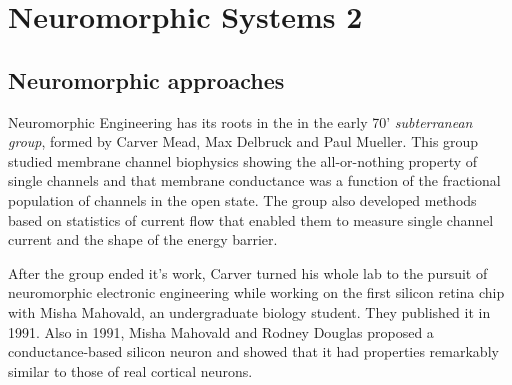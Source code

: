 \documentclass[main]{subfiles}
\begin{document}
\newpage
\section{Neuromorphic Systems 2} \label{l12}

\subsection{Neuromorphic approaches}
Neuromorphic Engineering has its roots in the in the early 70' \textit{subterranean group}, formed by Carver Mead, Max Delbruck and Paul Mueller. This group studied membrane channel biophysics showing the all-or-nothing property of single channels and that membrane conductance was a function of the fractional population of channels in the open state. The group also developed methods based on statistics of current flow that enabled them to measure single channel current and the shape of the energy barrier.

After the group ended it's work, Carver turned his whole lab to the pursuit of neuromorphic electronic engineering while working on the first silicon retina chip with Misha Mahovald, an undergraduate biology student. They published it in 1991.
Also in 1991, Misha Mahovald and Rodney Douglas proposed a conductance-based silicon neuron and showed that it had properties remarkably similar to those of real cortical neurons.
\end{document}
